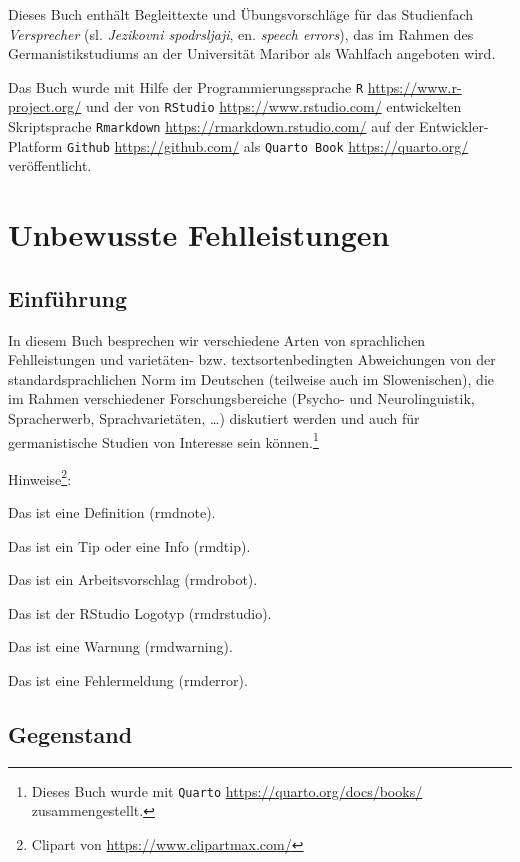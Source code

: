 \documentclass[
  letterpaper,
]{scrbook}
\begin{document}

Dieses Buch enthält Begleittexte und Übungsvorschläge für das
Studienfach \emph{Versprecher} (sl. \emph{Jezikovni spodrsljaji}, en.
\emph{speech errors}), das im Rahmen des Germanistikstudiums an der
Universität Maribor als Wahlfach angeboten wird.

Das Buch wurde mit Hilfe der Programmierungssprache \texttt{R}
\url{https://www.r-project.org/} und der von \texttt{RStudio}
\url{https://www.rstudio.com/} entwickelten Skriptsprache
\texttt{Rmarkdown} \url{https://rmarkdown.rstudio.com/} auf der
Entwickler-Platform \texttt{Github} \url{https://github.com/} als
\texttt{Quarto\ Book} \url{https://quarto.org/} veröffentlicht.

\part{Unbewusste Fehlleistungen}

\hypertarget{sec-einfuhrung}{%
\chapter{Einführung}\label{sec-einfuhrung}}

In diesem Buch besprechen wir verschiedene Arten von sprachlichen
Fehlleistungen und varietäten- bzw. textsortenbedingten Abweichungen von
der standardsprachlichen Norm im Deutschen (teilweise auch im
Slowenischen), die im Rahmen verschiedener Forschungsbereiche (Psycho-
und Neurolinguistik, Spracherwerb, Sprachvarietäten, \ldots) diskutiert
werden und auch für germanistische Studien von Interesse sein
können.\footnote{Dieses Buch wurde mit \texttt{Quarto}
  \url{https://quarto.org/docs/books/} zusammengestellt.}

Hinweise\footnote{Clipart von \url{https://www.clipartmax.com/}}:

Das ist eine Definition (rmdnote).

Das ist ein Tip oder eine Info (rmdtip).

Das ist ein Arbeitsvorschlag (rmdrobot).

Das ist der RStudio Logotyp (rmdrstudio).

Das ist eine Warnung (rmdwarning).

Das ist eine Fehlermeldung (rmderror).

\hypertarget{sec-gegenstand}{%
\chapter{Gegenstand}\label{sec-gegenstand}}
\end{document}
